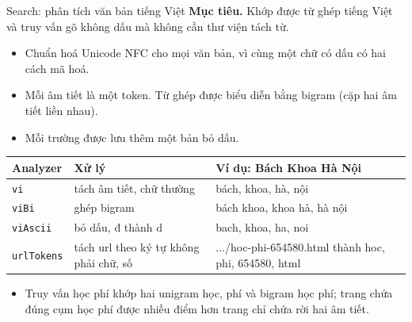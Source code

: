 \documentclass[aspectratio=169,t,10pt]{beamer}
\newcommand{\code}[1]{\texttt{#1}}
\newcommand{\ex}[1]{{\ttfamily\footnotesize #1}}
\newcommand{\muctieu}[1]{\noindent\textbf{Mục tiêu.} #1\par\vspace{4pt}}
\begin{document}
\begin{frame}{Search: phân tích văn bản tiếng Việt}
\small
\muctieu{Khớp được từ ghép tiếng Việt và truy vấn gõ không dấu mà không cần thư viện tách từ.}
\begin{itemize}
  \item Chuẩn hoá Unicode NFC cho mọi văn bản, vì cùng một chữ có dấu có hai cách mã hoá.
  \item Mỗi âm tiết là một token. Từ ghép được biểu diễn bằng bigram (cặp hai âm tiết liền nhau).
  \item Mỗi trường được lưu thêm một bản bỏ dấu.
\end{itemize}
\vspace{2pt}
\footnotesize
\renewcommand{\arraystretch}{1.3}
\begin{tabularx}{\textwidth}{@{}P{1.8cm}P{4.4cm}Y@{}}
\toprule
\textbf{Analyzer} & \textbf{Xử lý} & \textbf{Ví dụ: Bách Khoa Hà Nội}\\
\midrule
\code{vi} & tách âm tiết, chữ thường & \ex{bách}, \ex{khoa}, \ex{hà}, \ex{nội}\\
\code{viBi} & ghép bigram & \ex{bách khoa}, \ex{khoa hà}, \ex{hà nội}\\
\code{viAscii} & bỏ dấu, đ thành d & \ex{bach}, \ex{khoa}, \ex{ha}, \ex{noi}\\
\code{urlTokens} & tách url theo ký tự không phải chữ, số & \ex{.../hoc-phi-654580.html} thành \ex{hoc}, \ex{phi}, \ex{654580}, \ex{html}\\
\bottomrule
\end{tabularx}
\small
\vspace{4pt}
\begin{itemize}
  \item Truy vấn học phí khớp hai unigram \ex{học}, \ex{phí} và bigram \ex{học phí}; trang chứa đúng cụm học phí được nhiều điểm hơn trang chỉ chứa rời hai âm tiết.
\end{itemize}
\end{frame}
\end{document}
